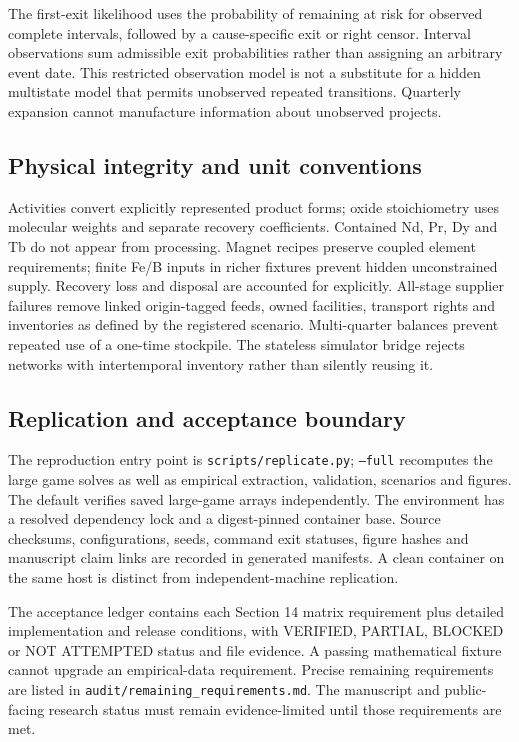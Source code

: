 \documentclass[11pt]{article}
\begin{document}
The first-exit likelihood uses the probability of remaining at risk for observed complete intervals, followed by a cause-specific exit or right censor. Interval observations sum admissible exit probabilities rather than assigning an arbitrary event date. This restricted observation model is not a substitute for a hidden multistate model that permits unobserved repeated transitions. Quarterly expansion cannot manufacture information about unobserved projects.

\subsection{Physical integrity and unit conventions}
Activities convert explicitly represented product forms; oxide stoichiometry uses molecular weights and separate recovery coefficients. Contained Nd, Pr, Dy and Tb do not appear from processing. Magnet recipes preserve coupled element requirements; finite Fe/B inputs in richer fixtures prevent hidden unconstrained supply. Recovery loss and disposal are accounted for explicitly. All-stage supplier failures remove linked origin-tagged feeds, owned facilities, transport rights and inventories as defined by the registered scenario. Multi-quarter balances prevent repeated use of a one-time stockpile. The stateless simulator bridge rejects networks with intertemporal inventory rather than silently reusing it.

\subsection{Replication and acceptance boundary}
The reproduction entry point is \texttt{scripts/replicate.py}; \texttt{--full} recomputes the large game solves as well as empirical extraction, validation, scenarios and figures. The default verifies saved large-game arrays independently. The environment has a resolved dependency lock and a digest-pinned container base. Source checksums, configurations, seeds, command exit statuses, figure hashes and manuscript claim links are recorded in generated manifests. A clean container on the same host is distinct from independent-machine replication.

The acceptance ledger contains each Section 14 matrix requirement plus detailed implementation and release conditions, with VERIFIED, PARTIAL, BLOCKED or NOT ATTEMPTED status and file evidence. A passing mathematical fixture cannot upgrade an empirical-data requirement. Precise remaining requirements are listed in \texttt{audit/remaining\_requirements.md}. The manuscript and public-facing research status must remain evidence-limited until those requirements are met.
\end{document}
